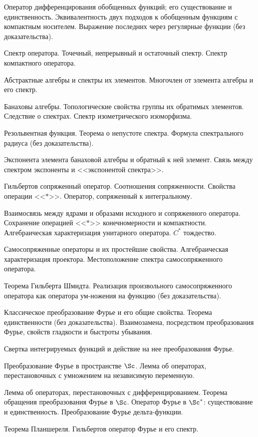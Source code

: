 \documentclass[a4paper]{article}
\begin{document}
\begin{nums}{-3}
\item Оператор дифференцирования обобщенных функций; его существование и
единственность. Эквивалентность двух подходов к обобщенным функциям с
компактным носителем. Выражение последних через регулярные функции (без доказательства).
\item Спектр оператора. Точечный, непрерывный и остаточный спектр. Спектр компактного оператора.
\item Абстрактные алгебры и спектры их элементов. Многочлен от элемента
алгебры и его спектр.
\item Банаховы алгебры. Топологические свойства группы их обратимых элементов.
Следствие о спектрах. Спектр изометрического изоморфизма.
\item Резольвентная функция. Теорема о непустоте спектра. Формула спектрального радиуса (без доказательства).
\item Экспонента элемента банаховой алгебры и обратный к ней элемент. Связь
между спектром экспоненты и <<экспонентой спектра>>.
\item Гильбертов сопряженный оператор. Соотношения сопряженности. Свойства операции
<<$*$>>. Оператор, сопряженный к интегральному.
\item Взаимосвязь между ядрами и образами исходного и сопряженного оператора.
Сохранение операцией <<$*$>> конечномерности и компактности.
Алгебраическая характеризация унитарного оператора. $C^*$ тождество.
\item Самосопряженные операторы и их простейшие свойства. Алгебраическая
характеризация проектора. Местоположение спектра самосопряженного оператора.
\item Теорема Гильберта Шмидта. Реализация произвольного самосопряженного оператора
как оператора ум-\break ножения на функцию (без доказательства).
\item Классическое преобразование Фурье и его общие свойства. Теорема единственности (без доказательства).
Взаимозамена, посредством преобразования Фурье, свойств гладкости и быстроты убывания.
\item Свертка интегрируемых функций и действие на нее преобразования Фурье.
\item Преобразование Фурье в пространстве $\Sc$. Лемма об операторах,
перестановочных с умножением на независимую переменную.
\item Лемма об операторах, перестановочных с дифференцированием. Теорема обращения преобразования Фурье
в $\Sc$. Оператор Фурье в $\Sc^*$: существование и единственность. Преобразование Фурье дельта-функции.
\item Теорема Планшереля. Гильбертов оператор Фурье и его спектр.
\end{nums}
\end{document}
